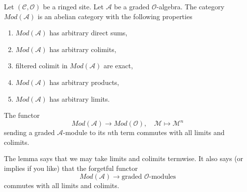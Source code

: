 \begin{lemma}
\label{lemma-gm-abelian}
Let $(\mathcal{C}, \mathcal{O})$ be a ringed site.
Let $\mathcal{A}$ be a graded $\mathcal{O}$-algebra.
The category $\textit{Mod}(\mathcal{A})$ is an abelian category
with the following properties
\begin{enumerate}
\item $\textit{Mod}(\mathcal{A})$ has arbitrary direct sums,
\item $\textit{Mod}(\mathcal{A})$ has arbitrary colimits,
\item filtered colimit in $\textit{Mod}(\mathcal{A})$ are exact,
\item $\textit{Mod}(\mathcal{A})$ has arbitrary products,
\item $\textit{Mod}(\mathcal{A})$ has arbitrary limits.
\end{enumerate}
The functor
$$
\textit{Mod}(\mathcal{A}) \longrightarrow \textit{Mod}(\mathcal{O}),\quad
\mathcal{M} \longmapsto \mathcal{M}^n
$$
sending a graded $\mathcal{A}$-module to its $n$th term commutes
with all limits and colimits.
\end{lemma}

\noindent
The lemma says that we may take limits and colimits termwise. It
also says (or implies if you like) that the forgetful functor
$$
\textit{Mod}(\mathcal{A})
\longrightarrow
\text{graded }\mathcal{O}\text{-modules}
$$
commutes with all limits and colimits.

